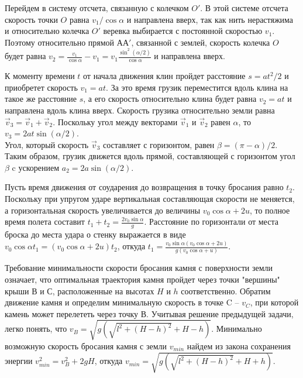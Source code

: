 \begin{Solution}{15}
Перейдем в систему отсчета, связанную с колечком $O'$. В этой системе отсчета скорость точки $O$ равна $v_1/ \cos \alpha$ и направлена вверх, так как нить нерастяжима и относительно колечка $O'$ веревка выбирается с постоянной скоростью $v_1$. Поэтому относительно прямой $АА'$, связанной с землей, скорость колечка $O$ будет равна $v_2 = \frac{v_1}{\cos \alpha} - v_1 = v_1 \frac{\sin^2 (\alpha /2)}{\cos \alpha}$ и направлена вверх.
\end{Solution}
\begin{Solution}{16}
К моменту времени $t$ от начала движения клин пройдет расстояние $s = at^2/2$ и приобретет скорость $v_1 = at$. За это время грузик переместится вдоль клина на такое же расстояние $s$, а его скорость относительно клина будет равна $v_2 = at$ и направлена вдоль клина вверх. Скорость грузика относительно земли равна $\vec{v}_3 = \vec{v}_1 + \vec{v}_2$. Поскольку угол между векторами $\vec{v}_1$ и $\vec{v}_2$ равен $\alpha$, то $v_3 = 2at \sin (\alpha /2)$. \\
Угол, который скорость $\vec{v}_3$ составляет с горизонтом, равен $\beta  = (\pi - \alpha)/2$. Таким образом, грузик движется вдоль прямой, составляющей с горизонтом угол $\beta$ c ускорением $a_2 = 2a \sin (\alpha /2)$.
\end{Solution}
\begin{Solution}{23}
Пусть время движения от соударения до возвращения в точку бросания равно $t_2$. Поскольку при упругом ударе вертикальная составляющая скорости не меняется, а горизонтальная скорость увеличивается до величины $v_0 \cos \alpha + 2u$, то полное время полета составит $t_1 + t_2 = \frac{2v_0 \sin \alpha}{g}$. Расстояние по горизонтали от места броска до места удара о стенку выражается в виде $v_0 \cos \alpha t_1 = (v_0 \cos \alpha +2u)t_2$, откуда $t_1 = \frac{v_0 \sin \alpha (v_0 \cos \alpha + 2u)}{g(v_0 \cos \alpha + u)}$.
\end{Solution}
\begin{Solution}{28}
Требование минимальности скорости бросания камня с поверхности земли означает, что оптимальная траектория камня пройдет через точки "вершины" крыши В и С, расположенные на высотах $H$ и $h$ соответственно. Обратим движение камня и определим минимальную скорость в точке C -- $v_C$, при которой камень может перелететь через точку В. Учитывая решение предыдущей задачи, легко понять, что $v_B = \sqrt{g \left(\sqrt{l^2 + (H-h)^2} + H-h \right)}$. Минимально возможную скорость бросания камня с земли $v_{min}$ найдем из закона сохранения энергии $v_{min}^2 = v_B^2 + 2gH$, откуда $v_{min} = \sqrt{g \left(\sqrt{l^2 + (H-h)^2} + H + h \right)}$.
\end{Solution}
